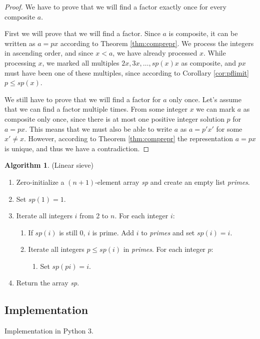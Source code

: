\documentclass[12pt] {article}
\theoremstyle{plain}
\theoremstyle{definition}
\newtheorem{algo}[thm]{Algorithm}
\begin{document}
\begin{proof}
We have to prove that we will find a factor exactly once for every composite $a$.

First we will prove that we will find a factor. Since $a$ is composite, it can be written as $a = px$ according to Theorem \ref{thm:comprepr}. We process the integers in ascending order, and since $x < a$, we have already processed $x$. While processing $x$, we marked all multiples $2x, 3x, \dots, sp(x)x$ as composite, and $px$ must have been one of these multiples, since according to Corollary \ref{cor:pflimit} $p \leq sp(x)$.

We still have to prove that we will find a factor for $a$ only once. Let's assume that we can find a factor multiple times. From some integer $x$ we can mark $a$ as composite only once, since there is at most one positive integer solution $p$ for $a = px$. This means that we must also be able to write $a$ as $a = p'x'$ for some $x' \neq x$. However, according to Theorem \ref{thm:comprepr} the representation $a = px$ is unique, and thus we have a contradiction.
\end{proof}

\begin{algo} (Linear sieve)
\begin{enumerate}
\item Zero-initialize a $(n+1)$-element array \textit{sp} and create an empty list \textit{primes}.
\item Set $sp(1) = 1$.
\item Iterate all integers $i$ from 2 to $n$. For each integer $i$:
\begin{enumerate}
	\item If $sp(i)$ is still 0, $i$ is prime. Add $i$ to \textit{primes} and set $sp(i) = i$.
	\item Iterate all integers $p \leq sp(i)$ in \textit{primes}. For each integer $p$:
\begin{enumerate}
		\item Set $sp(pi) = i$.
\end{enumerate}
\end{enumerate}
\item Return the array \textit{sp}.
\end{enumerate}
\end{algo}

\subsection {Implementation}

Implementation in Python 3.



\printbibliography
\end{document}

